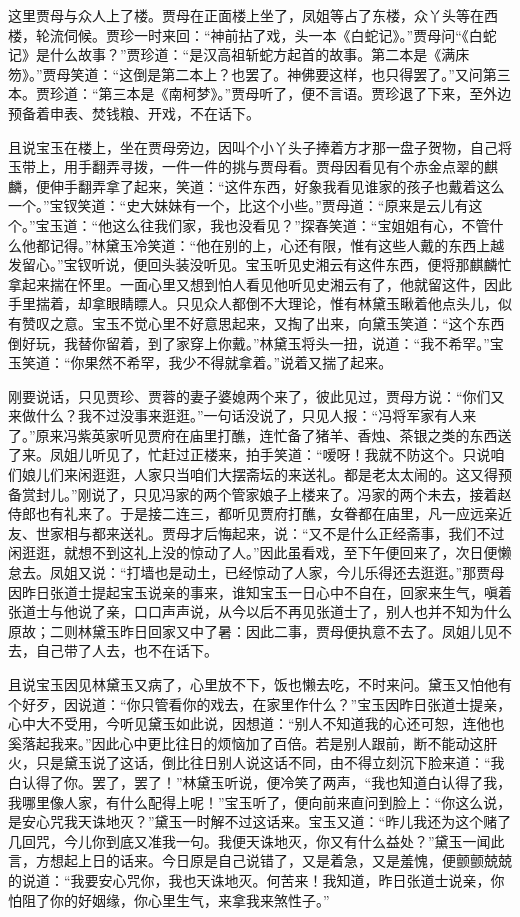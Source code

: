 \documentclass[12pt,oneside]{book}
\begin{document}
这里贾母与众人上了楼。贾母在正面楼上坐了，凤姐等占了东楼，众丫头等在西楼，轮流伺候。贾珍一时来回：“神前拈了戏，头一本《白蛇记》。”贾母问“《白蛇记》是什么故事？”贾珍道：“是汉高祖斩蛇方起首的故事。第二本是《满床笏》。”贾母笑道：“这倒是第二本上？也罢了。神佛要这样，也只得罢了。”又问第三本。贾珍道：“第三本是《南柯梦》。”贾母听了，便不言语。贾珍退了下来，至外边预备着申表、焚钱粮、开戏，不在话下。

且说宝玉在楼上，坐在贾母旁边，因叫个小丫头子捧着方才那一盘子贺物，自己将玉带上，用手翻弄寻拨，一件一件的挑与贾母看。贾母因看见有个赤金点翠的麒麟，便伸手翻弄拿了起来，笑道：“这件东西，好象我看见谁家的孩子也戴着这么一个。”宝钗笑道：“史大妹妹有一个，比这个小些。”贾母道：“原来是云儿有这个。”宝玉道：“他这么往我们家，我也没看见？”探春笑道：“宝姐姐有心，不管什么他都记得。”林黛玉冷笑道：“他在别的上，心还有限，惟有这些人戴的东西上越发留心。”宝钗听说，便回头装没听见。宝玉听见史湘云有这件东西，便将那麒麟忙拿起来揣在怀里。一面心里又想到怕人看见他听见史湘云有了，他就留这件，因此手里揣着，却拿眼睛瞟人。只见众人都倒不大理论，惟有林黛玉瞅着他点头儿，似有赞叹之意。宝玉不觉心里不好意思起来，又掏了出来，向黛玉笑道：“这个东西倒好玩，我替你留着，到了家穿上你戴。”林黛玉将头一扭，说道：“我不希罕。”宝玉笑道：“你果然不希罕，我少不得就拿着。”说着又揣了起来。

刚要说话，只见贾珍、贾蓉的妻子婆媳两个来了，彼此见过，贾母方说：“你们又来做什么？我不过没事来逛逛。”一句话没说了，只见人报：“冯将军家有人来了。”原来冯紫英家听见贾府在庙里打醮，连忙备了猪羊、香烛、茶银之类的东西送了来。凤姐儿听见了，忙赶过正楼来，拍手笑道：“嗳呀！我就不防这个。只说咱们娘儿们来闲逛逛，人家只当咱们大摆斋坛的来送礼。都是老太太闹的。这又得预备赏封儿。”刚说了，只见冯家的两个管家娘子上楼来了。冯家的两个未去，接着赵侍郎也有礼来了。于是接二连三，都听见贾府打醮，女眷都在庙里，凡一应远亲近友、世家相与都来送礼。贾母才后悔起来，说：“又不是什么正经斋事，我们不过闲逛逛，就想不到这礼上没的惊动了人。”因此虽看戏，至下午便回来了，次日便懒怠去。凤姐又说：“打墙也是动土，已经惊动了人家，今儿乐得还去逛逛。”那贾母因昨日张道士提起宝玉说亲的事来，谁知宝玉一日心中不自在，回家来生气，嗔着张道士与他说了亲，口口声声说，从今以后不再见张道士了，别人也并不知为什么原故；二则林黛玉昨日回家又中了暑：因此二事，贾母便执意不去了。凤姐儿见不去，自己带了人去，也不在话下。

且说宝玉因见林黛玉又病了，心里放不下，饭也懒去吃，不时来问。黛玉又怕他有个好歹，因说道：“你只管看你的戏去，在家里作什么？”宝玉因昨日张道士提亲，心中大不受用，今听见黛玉如此说，因想道：“别人不知道我的心还可恕，连他也奚落起我来。”因此心中更比往日的烦恼加了百倍。若是别人跟前，断不能动这肝火，只是黛玉说了这话，倒比往日别人说这话不同，由不得立刻沉下脸来道：“我白认得了你。罢了，罢了！”林黛玉听说，便冷笑了两声，“我也知道白认得了我，我哪里像人家，有什么配得上呢！”宝玉听了，便向前来直问到脸上：“你这么说，是安心咒我天诛地灭？”黛玉一时解不过这话来。宝玉又道：“昨儿我还为这个赌了几回咒，今儿你到底又准我一句。我便天诛地灭，你又有什么益处？”黛玉一闻此言，方想起上日的话来。今日原是自己说错了，又是着急，又是羞愧，便颤颤兢兢的说道：“我要安心咒你，我也天诛地灭。何苦来！我知道，昨日张道士说亲，你怕阻了你的好姻缘，你心里生气，来拿我来煞性子。”
\end{document}
